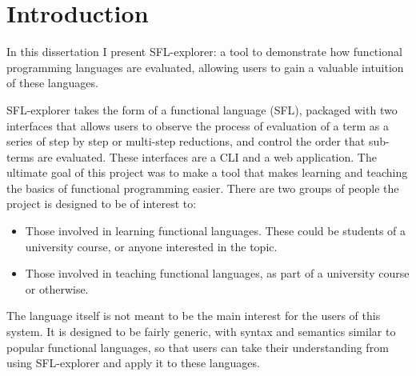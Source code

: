 \chapter{Introduction}
\label{chap:context}

In this dissertation I present SFL-explorer: a tool to demonstrate how functional programming languages are evaluated, allowing users to gain a valuable intuition of these languages.

SFL-explorer takes the form of a functional language (\ac{SFL}), packaged with two interfaces that allows users to observe the process of evaluation of a term as a series of step by step or multi-step reductions, and control the order that sub-terms are evaluated. These interfaces are a \ac{CLI} and a web application. The ultimate goal of this project was to make a tool that makes learning and teaching the basics of functional programming easier. There are two groups of people the project is designed to be of interest to:
\begin{itemize}
    \item Those involved in learning functional languages. These could be students of a university course, or anyone interested in the topic. 
    \item Those involved in teaching functional languages, as part of a university course or otherwise.
\end{itemize}

The language itself is not meant to be the main interest for the users of this system. It is designed to be fairly generic, with syntax and semantics similar to popular functional languages, so that users can take their understanding from using SFL-explorer and apply it to these languages. 

